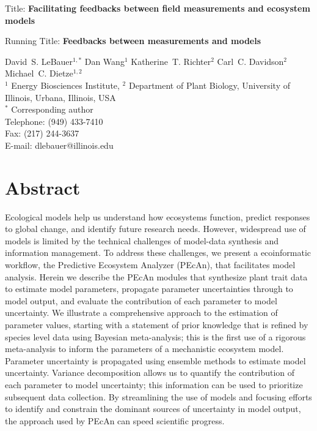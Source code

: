 \documentclass[12pt]{article}
\date{} %
\begin{document}
\begin{flushleft}
\begin{spacing}{1.9}


{\Large Title: \textbf{Facilitating feedbacks between field measurements and ecosystem models}}

Running Title: \textbf{Feedbacks between measurements and models}

David~S. LeBauer$^{1,\ast}$
Dan Wang$^{1}$
Katherine~T. Richter$^{2}$
Carl~C. Davidson$^{2}$
Michael~C. Dietze$^{1,2}$
\\
\vspace{1em}
$^1$ Energy Biosciences Institute, $^2$ Department of Plant Biology, University of Illinois, Urbana, Illinois, USA
\\
\vspace{1em}
$^\ast$ Corresponding author \\ Telephone: (949) 433-7410 \\ Fax: (217) 244-3637 \\ E-mail: dlebauer@illinois.edu 

\newpage

\section*{Abstract} %
Ecological models help us understand how ecosystems function, predict responses to global change, and identify future research needs. 
However, widespread use of models is limited by the technical challenges of model-data synthesis and information management. 
 To address these challenges, we present a ecoinformatic workflow, the Predictive Ecosystem Analyzer (PEcAn), that facilitates model analysis. 
 Herein we describe the PEcAn modules that synthesize plant trait data to estimate model parameters, propagate parameter uncertainties through to model output, and evaluate the contribution of each parameter to model uncertainty. 
 We illustrate a comprehensive approach to the estimation of parameter values, starting with a statement of prior knowledge that is refined by species level data using Bayesian meta-analysis; this is the first use of a rigorous meta-analysis to inform the parameters of a mechanistic ecosystem model. 
 Parameter uncertainty is propagated using ensemble methods to estimate model uncertainty. 
Variance decomposition allows us to quantify the contribution of each parameter to model uncertainty; this information can be used to prioritize subsequent data collection.
 By streamlining the use of models and focusing efforts to identify and constrain the dominant sources of uncertainty in model output, the approach used by PEcAn can speed scientific progress.


\end{spacing}
\end{flushleft}
\end{document}
